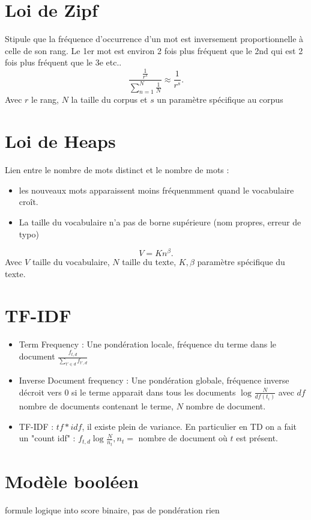 \documentclass{article}
\theoremstyle{plain}%
\theoremstyle{definition}
\theoremstyle{remark}
\begin{document}
\section{Loi de Zipf}
Stipule que la fréquence d'occurrence d'un mot est inversement proportionnelle à celle de son rang. Le 1er mot est environ 2 fois plus fréquent que le 2nd qui est 2 fois plus fréquent que le 3e etc.. 
\[
    \frac{ \frac{1 }{r^s}}{ \sum_{n=1}^{N} \frac{1}{N}} \approx \frac{1}{r^s}
.\]
Avec $ r $ le rang, $ N $ la taille du corpus et $ s $ un paramètre spécifique au corpus

\section{Loi de Heaps}
Lien entre le nombre de mots distinct et le nombre de mots : \begin{itemize}
    \item les nouveaux mots apparaissent moins fréquenmment quand le vocabulaire croît. 
    \item La taille du vocabulaire n'a pas de borne supérieure (nom propres, erreur de typo)
\end{itemize} 
\[
    V = K n ^\beta 
.\]
Avec $ V $ taille du vocabulaire, $ N $ taille du texte, $ K, \beta  $ paramètre spécifique du texte.

\section{TF-IDF}
\begin{itemize}
    \item Term Frequency : Une pondération locale, fréquence du terme dans le document $ \frac{f_{t,d}}{\sum_{t' \in d}^{} f_{t', d}} $ 
    \item Inverse Document frequency : Une pondération globale, fréquence inverse décroit vers 0 si le terme apparait dans tous les documents $ \log_{} \frac{N}{df(t_i)} $ avec $ df $ nombre de documents contenant le terme, $ N $ nombre de document. 
    \item TF-IDF : $ tf * idf $, il existe plein de variance. En particulier en TD on a fait un "count idf" : $ f_{t,d} \log_{} \frac{N}{n_t}, n_t = $ nombre de document où $ t $ est présent.
\end{itemize}


\section{Modèle booléen}
formule logique into score binaire, pas de pondération rien
\end{document}
